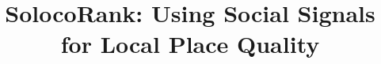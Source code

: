 %
%
%
%

\newcommand{\squishlist}{
  \begin{list}{$\bullet$}{
      \setlength{\itemsep}{2pt}       \setlength{\parsep}{3pt}
      \setlength{\topsep}{3pt}        \setlength{\partopsep}{0pt}
      \setlength{\leftmargin}{3.5mm}  \setlength{\labelwidth}{1em}
      \setlength{\labelsep}{0.5em} } }

\newcommand{\squishend}{\end{list}}

\documentclass{acm_proc_article-sp}



\title{SolocoRank: Using Social Signals for Local Place Quality}
%
%
%
%
%

